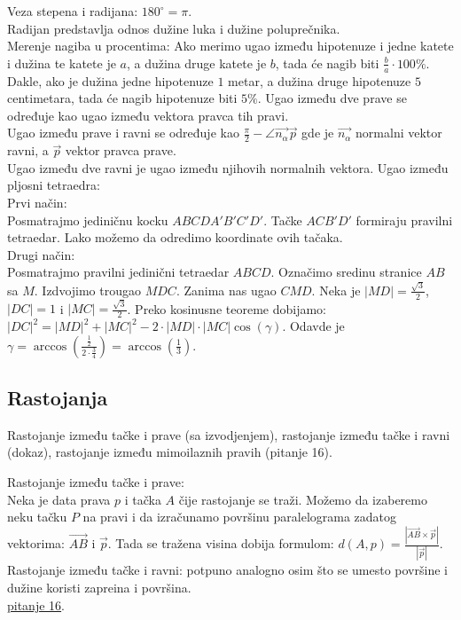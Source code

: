 \documentclass[12pt]{article}
\newcommand{\vek}[1]{\overrightarrow{#1}}
\begin{document}
    \vspace*{1cm}

    Veza stepena i radijana: $180^\circ=\pi$.\\
    Radijan predstavlja odnos dužine luka i dužine poluprečnika.\\
    Merenje nagiba u procentima: Ako merimo ugao između hipotenuze
    i jedne katete i dužina te katete je $a$, a dužina druge
    katete je $b$, tada će nagib biti $\frac{b}{a}\cdot 100\%$. Dakle,
    ako je dužina jedne hipotenuze $1$ metar, a dužina druge
    hipotenuze $5$ centimetara, tada će nagib hipotenuze biti $5\%$.
    Ugao između dve prave se određuje kao ugao između vektora pravca
    tih pravi.\\
    Ugao između prave i ravni se određuje kao $\frac{\pi}{2}-\angle{\vek{n_\alpha}\vek{p}}$
    gde je $\vek{n_\alpha}$ normalni vektor ravni, a $\vek{p}$ vektor pravca prave.\\
    Ugao između dve ravni je ugao između njihovih normalnih vektora.
    Ugao između pljosni tetraedra:\\
    Prvi način:\\
    Posmatrajmo jediničnu kocku $ABCDA'B'C'D'$.
    Tačke $ACB'D'$ formiraju pravilni tetraedar. Lako možemo
    da odredimo koordinate ovih tačaka.\\
    Drugi način:\\
    Posmatrajmo pravilni jedinični tetraedar $ABCD$. Označimo sredinu
    stranice $AB$ sa $M$. Izdvojimo trougao $MDC$. Zanima nas
    ugao $CMD$. Neka je $|MD|=\frac{\sqrt{3}}{2}$, $|DC|=1$ i $|MC|=\frac{\sqrt{3}}{2}$.
    Preko kosinusne teoreme dobijamo:\\
$|DC|^2=|MD|^2+|MC|^2-2\cdot|MD|\cdot|MC|\cos(\gamma)$.
    Odavde je $\gamma=\arccos(\frac{\frac{1}{2}}{2\cdot\frac{3}{4}})=\arccos(\frac{1}{3})$.

    \subsection{Rastojanja}
    Rastojanje između tačke i prave (sa izvodjenjem),
    rastojanje između tačke i ravni (dokaz), rastojanje između
    mimoilaznih pravih (pitanje 16).\par

    \vspace*{1cm}

    Rastojanje između tačke i prave:\\
    Neka je data prava $p$ i tačka $A$ čije rastojanje se traži.
    Možemo da izaberemo neku tačku $P$ na pravi i da izračunamo
    površinu paralelograma zadatog vektorima: $\vek{AB}$ i $\vek{p}$.
    Tada se tražena visina dobija formulom: $d(A,p)=\frac{|\vek{AB}\times\vek{p}|}{|\vek{p}|}$.\\
Rastojanje između tačke i ravni: potpuno analogno osim što
se umesto površine i dužine koristi zapreina i površina.\\
\hyperlink{subsec:pitanje_16}{pitanje 16}.
\end{document}
